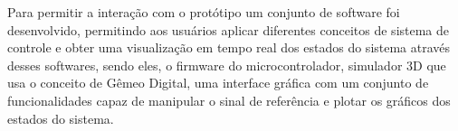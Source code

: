 Para permitir a interação com o protótipo um conjunto de software foi desenvolvido, permitindo aos usuários aplicar diferentes conceitos de sistema de controle e obter uma visualização em tempo real dos estados do sistema através desses softwares, sendo eles, o firmware do microcontrolador, simulador 3D que usa o conceito de Gêmeo Digital, uma interface gráfica com um conjunto de funcionalidades capaz de manipular o sinal de referência e plotar os gráficos dos estados do sistema.